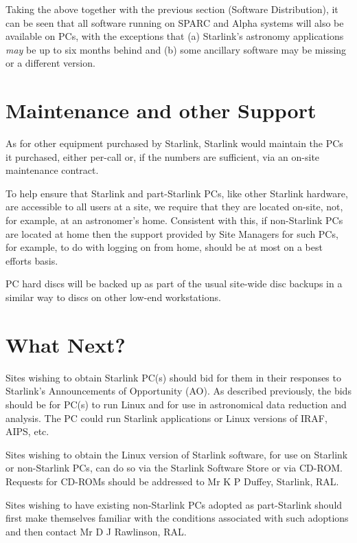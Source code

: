 \documentclass[twoside,11pt]{article}
\begin{document}
Taking the above together with the
previous section (Software Distribution), it can be seen that all
software running on SPARC and Alpha systems will also be available on
PCs, with the exceptions that (a) Starlink's astronomy applications {\em may}
be up to six months behind and (b) some ancillary software may be
missing or a different version.

\section{Maintenance and other Support}
 
As for other equipment purchased by Starlink, Starlink would maintain
the PCs it purchased, either per-call or, if the numbers are sufficient,
via an on-site maintenance contract.
 
To help ensure that Starlink and part-Starlink PCs, like other
Starlink hardware, are accessible to all users at a site, we require
that they are located on-site, not, for example, at an astronomer's home.
Consistent with this, if non-Starlink
PCs are located at home then the support provided by Site Managers
for such PCs, for example, to do with logging on from home, should be
at most
on a best efforts basis.
 
PC hard discs will be backed up as part of the usual site-wide disc
backups in a similar way to discs on other low-end workstations.

\section{What Next?}
 
Sites wishing to obtain  Starlink PC(s) should bid for them
in their responses to Starlink's Announcements of Opportunity
(AO).  As described previously, the bids should be for PC(s)
to run Linux and for use in astronomical data reduction and
analysis.  The PC could run Starlink applications or
Linux versions of IRAF, AIPS, etc.
 
Sites wishing to obtain the Linux version of Starlink software,
for use on Starlink or non-Starlink PCs,
can do so via the Starlink Software Store 
or via CD-ROM.  Requests for CD-ROMs should be addressed to
Mr K P Duffey, Starlink, RAL.
 
Sites wishing to have existing non-Starlink PCs adopted as
part-Starlink should first make themselves familiar with
the conditions associated with such adoptions and then
contact Mr D J Rawlinson, RAL.
 
\end{document}
